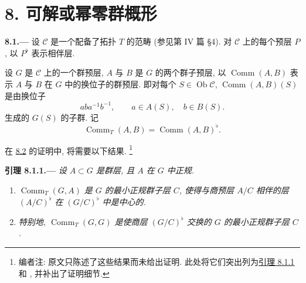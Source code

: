 
\section*{8. 可解或幂零群概形}
\label{sec:sga3-VIB-8}%

\medskip
{}\label{par:sga3-VIB-8.1}%
\noindent\textbf{8.1.---}
设 \(\mathcal C\) 是一个配备了拓扑 \(T\) 的范畴
(参见第 IV 篇 \S4).
对 \(\mathcal C\) 上的每个预层 \(P\),
以 \(P^\flat\) 表示相伴层.

设 \(G\) 是 \(\mathcal C\) 上的一个群预层,
\(A\) 与 \(B\) 是 \(G\) 的两个群子预层,
以 \(\operatorname{Comm}(A,B)\) 表示 \(A\) 与 \(B\)
在 \(G\) 中的换位子的群预层.
即对每个 \(S\in\operatorname{Ob}\mathcal C\),
\(\operatorname{Comm}(A,B)(S)\) 是由换位子
\[
  aba^{-1}b^{-1},
  \qquad a\in A(S),\quad b\in B(S).
\]
生成的 \(G(S)\) 的子群. 记
\label{form:sga3-VIB-8.1-CommT}%
\[
  \operatorname{Comm}_T(A,B)
    =\operatorname{Comm}(A,B)^\flat.
\]

在 \hyperref[prop:sga3-VIB-8.2]{8.2} 的证明中, 将需要以下结果.%
\footnote{\label{note:sga3-VIB-81}编者注: 原文只陈述了这些结果而未给出证明.
此处将它们突出列为\hyperref[lem:sga3-VIB-8.1.1]{引理 8.1.1} 和
, 并补出了证明细节.}

\medskip
{}\label{lem:sga3-VIB-8.1.1}%
\noindent\textbf{引理 8.1.1.---}
\emph{设 \(A\subset G\) 是群层, 且 \(A\) 在 \(G\) 中正规.}
\begin{enumerate}
\item[\textup{\SGAInlineRefTarget{lem:sga3-VIB-8.1.1:item:i}(i)}]\label{concl:sga3-VIB-8.1.1-i}
  \emph{\(\operatorname{Comm}_T(G,A)\) 是 \(G\) 的最小正规群子层 \(C\),
  使得与商预层 \(A/C\) 相伴的层 \((A/C)^\flat\)
  在 \((G/C)^\flat\) 中是中心的.}

\item[\textup{(ii)}]\label{concl:sga3-VIB-8.1.1-ii}
  \emph{特别地, \(\operatorname{Comm}_T(G,G)\)
  是使商层 \((G/C)^\flat\) 交换的 \(G\) 的最小正规群子层 \(C\).}
\end{enumerate}

